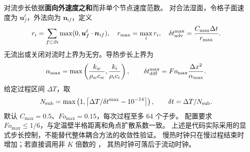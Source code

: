 对流步长依据\textbf{面向外速度之和}而非单个节点速度范数。
对合法湿面，令格子面速度为 $\bm u_f^\ell$，外法向为 $\bm n_{if}$，定义
\begin{equation}
 r_i=\sum_{f\subset\partial i}\max(0,\bm u_f^\ell\cdot\bm n_{if}),
 \quad r_{\max}=\max_i r_i,
 \quad \delta t_{\rm adv}^{\max}=\frac{C_{\max}\Delta t}{r_{\max}}.
\end{equation}
无流出或关闭对流时上界为无穷。导热步长上界为
\begin{equation}
 \alpha_{\max}=\max\left(\frac{k_w}{\rho_wc_w},\frac{k_i}{\rho_ic_i}\right),
 \qquad \delta t_{\rm diff}^{\max}=Fo_{\max}\frac{\Delta x^2}{\alpha_{\max}}.
\end{equation}
给定过程区间 $\Delta T$，取
\begin{equation}
 N_{\rm sub}=\max\left(1,\left\lceil\Delta T/\delta t^{\max}-10^{-14}\right\rceil\right),
 \qquad \delta t=\Delta T/N_{\rm sub}.
\end{equation}
默认 $C_{\max}=0.5$、$Fo_{\max}=0.15$，每次过程至多 64 个子步。
配置要求 $Fo_{\max}\leq1/6$，与定温壁半格距离和角点扩散系数一致。
上述是代码实际采用的显式步长控制，不能替代整体耦合方法的收敛性验证。
慢热时钟只在慢过程结束时增加；若直接调用非 $K$ 倍数的 ，
其热时钟可落后于流动时钟。
